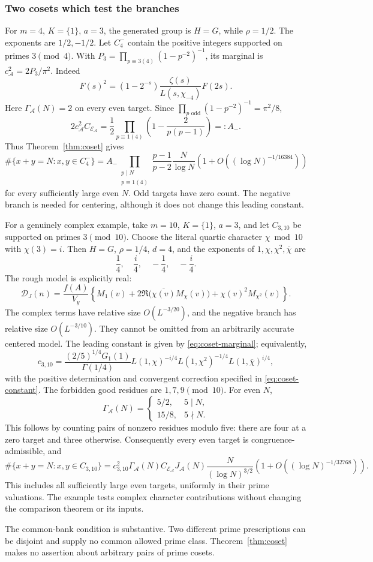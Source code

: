 \subsubsection{Two cosets which test the branches}

For \(m=4\), \(K=\{1\}\), \(a=3\), the generated group is
\(H=G\), while \(\rho=1/2\). The exponents are \(1/2,-1/2\).
Let \(C^-_4\) contain the positive integers supported on primes
\(3\pmod4\). With
\(P_3=\prod_{p\equiv3(4)}(1-p^{-2})^{-1}\), its marginal is
\(c_{\mathscr A}^2=2P_3/\pi^2\). Indeed
\[
 F(s)^2=(1-2^{-s})\frac{\zeta(s)}{L(s,\chi_{-4})}F(2s).
\]
Here \(\Gamma_{\mathscr A}(N)=2\) on every even target. Since
\(\prod_{p\text{ odd}}(1-p^{-2})^{-1}=\pi^2/8\),
\[
 2c_{\mathscr A}^2C_{\mathcal E_{\mathscr A}}
       =\frac12\prod_{p\equiv1(4)}
                    \left(1-\frac2{p(p-1)}\right)=:A_-.
\]
Thus Theorem~\ref{thm:coset} gives
\[
 \#\{x+y=N:x,y\in C^-_4\}
 = A_-\prod_{\substack{p\mid N\\p\equiv1(4)}}\frac{p-1}{p-2}
       \frac N{\log N}
       \left(1+O((\log N)^{-1/16384})\right)
\]
for every sufficiently large even \(N\). Odd targets have zero
count. The negative branch is needed for centering, although it
does not change this leading constant.

For a genuinely complex example, take \(m=10\), \(K=\{1\}\),
\(a=3\), and let \(C_{3,10}\) be supported on primes
\(3\pmod{10}\). Choose the literal quartic character \(\chi\bmod10\)
with \(\chi(3)=i\). Then \(H=G\), \(\rho=1/4\), \(d=4\), and
the exponents of \(1,\chi,\chi^2,\overline\chi\) are
\[
                       \frac14,\quad\frac i4,\quad-\frac14,
                                      \quad-\frac i4.
\]
The rough model is explicitly real:
\[
 \mathcal D_J(n)=\frac{f(A)}{V_y}
   \left\{M_1(v)+2\Re\bigl(\overline{\chi(v)}M_\chi(v)\bigr)
                       +\chi(v)^2 M_{\chi^2}(v)\right\}.
\]
The complex terms have relative size \(O(L^{-3/20})\), and the
negative branch has relative size \(O(L^{-3/10})\). They cannot
be omitted from an arbitrarily accurate centered model.
The leading constant is given by \eqref{eq:coset-marginal}; equivalently,
\[
 c_{3,10}=\frac{(2/5)^{1/4}G_1(1)}{\Gamma(1/4)}
       L(1,\chi)^{-i/4}L(1,\chi^2)^{-1/4}
                              L(1,\overline\chi)^{i/4},
\]
with the positive determination and convergent correction specified
in \eqref{eq:coset-constant}. The forbidden good residues are
\(1,7,9\pmod{10}\). For even \(N\),
\[
 \Gamma_{\mathscr A}(N)=
 \begin{cases}5/2,&5\mid N,\\15/8,&5\nmid N.\end{cases}
\]
This follows by counting pairs of nonzero residues modulo five:
there are four at a zero target and three otherwise. Consequently
every even target is congruence-admissible, and
\[
 \#\{x+y=N:x,y\in C_{3,10}\}
 =c_{3,10}^2\Gamma_{\mathscr A}(N)C_{\mathcal E_{\mathscr A}}J_{\mathscr A}(N)
       \frac N{(\log N)^{3/2}}
       \left(1+O((\log N)^{-1/32768})\right).
\]
This includes all sufficiently large even targets, uniformly in
their prime valuations. The example tests complex character
contributions without changing the comparison theorem or its inputs.

The common-bank condition is substantive. Two different prime
prescriptions can be disjoint and supply no common allowed prime
class. Theorem~\ref{thm:coset} makes no assertion about arbitrary
pairs of prime cosets.
